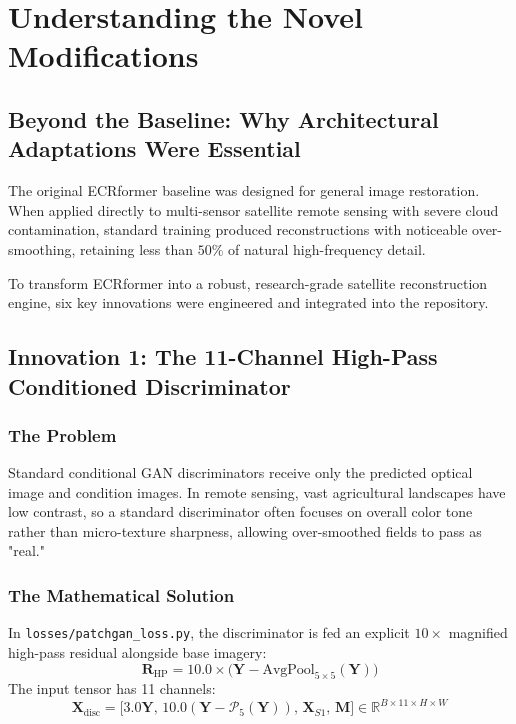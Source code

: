 \chapter{Understanding the Novel Modifications}
\label{chap:ch20}

\section{Beyond the Baseline: Why Architectural Adaptations Were Essential}
The original ECRformer baseline was designed for general image restoration. When applied directly to multi-sensor satellite remote sensing with severe cloud contamination, standard training produced reconstructions with noticeable over-smoothing, retaining less than $50\%$ of natural high-frequency detail.

To transform ECRformer into a robust, research-grade satellite reconstruction engine, six key innovations were engineered and integrated into the repository.

\section{Innovation 1: The 11-Channel High-Pass Conditioned Discriminator}
\subsection{The Problem}
Standard conditional GAN discriminators receive only the predicted optical image and condition images. In remote sensing, vast agricultural landscapes have low contrast, so a standard discriminator often focuses on overall color tone rather than micro-texture sharpness, allowing over-smoothed fields to pass as "real."

\subsection{The Mathematical Solution}
In \texttt{losses/patchgan\_loss.py}, the discriminator is fed an explicit $10\times$ magnified high-pass residual alongside base imagery:
\begin{equation}
\mathbf{R}_{\text{HP}} = 10.0 \times \big(\mathbf{Y} - \text{AvgPool}_{5\times 5}(\mathbf{Y})\big)
\end{equation}
The input tensor has 11 channels:
\[
\mathbf{X}_{\text{disc}} = \big[ 3.0 \mathbf{Y}, \, 10.0 (\mathbf{Y} - \mathcal{P}_5(\mathbf{Y})), \, \mathbf{X}_{S1}, \, \mathbf{M} \big] \in \mathbb{R}^{B \times 11 \times H \times W}
\]
